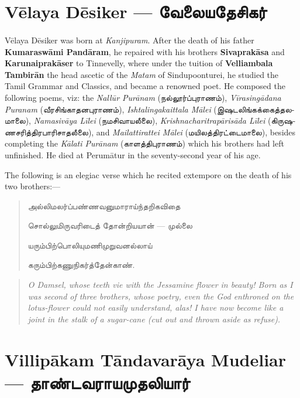 \documentclass{article}
\newcommand{\TamilText}[1]{\texttamil{#1}}
\newcommand{\TamilBold}[1]{\texttamil{\textbf{#1}}}
\newcommand{\tam}[1]{\TamilText{#1}}
\newcommand{\tambold}[1]{\TamilBold{#1}}
\begin{document}
\section{V\={e}laya D\={e}siker --- \tambold{வேலையதேசிகர்}}
\paragraph{}
V\={e}laya D\={e}siker was born at \emph{Kanjipuram}. After the death of his father \textbf{Kumarasw\={a}mi Pand\={a}ram}, he repaired with his brothers \textbf{Sivaprak\={a}sa} and \textbf{Karunaiprak\={a}ser} to Tinnevelly, where under the tuition of \textbf{Velliambala Tambir\={a}n} the head ascetic of the \emph{Matam} of Sindupoonturei, he studied the Tamil Grammar and Classics, and became a renowned poet. He composed the following poems, viz: the \emph{Nall\={u}r Pur\={a}nam} (\tam{நல்லூர்ப்புராணம்}), \emph{V\={i}rasing\={a}dana Puranam} (\tam{வீரசிங்காதனபுராணம்}), \emph{Ishtalingakaittala M\={a}lei} (\tam{இஷடலிங்கக்கைத்தலமாலை}), \emph{Namasiv\={a}ya L\={i}lei} (\tam{நமசிவாயலீலை}), \emph{Krishnacharitrap\={a}ris\={a}da L\={i}lei} (\tam{கிருஷணசரித்திரபாரிசாதலீலை}), and \emph{Mailattirattei M\={a}lei} (\tam{மயிலத்திரட்டைமாலை}), besides completing the \emph{K\={a}lati Pur\={a}nam} (\tam{காளத்திபுராணம்}) which his brothers had left unfinished. He died at Perum\={a}tur in the seventy-second year of his age.

The following is an elegiac verse which he recited extempore on the death of his two brothers:---
\begin{quotation}\small
\tam{அல்லிமலர்ப்பண்ணவனுமாராய்ந்தறிகவிதை}

\tam{சொல்லுமிருவரிடைத் தோன்றியயான்‌} --- \tam{முல்லை}

\tam{யரும்பிற்பொலியுமணிமுறுவனல்லாய்‌}

\tam{கரும்பிற்கணுநிகர்த்தேன்காண்‌}.
\end{quotation}
\begin{quotation}\small
\emph{O Damsel, whose teeth vie with the Jessamine flower in beauty! Born as I was second of three brothers, whose poetry, even the God enthroned on the lotus-flower could not easily understand, alas! I have now become like a joint in the stalk of a sugar-cane (cut out and thrown aside as refuse).}
\end{quotation}

\section{Villip\={a}kam T\={a}ndavar\={a}ya Mudeliar --- \tambold{தாண்டவராயமுதலியார்}}
\end{document}
